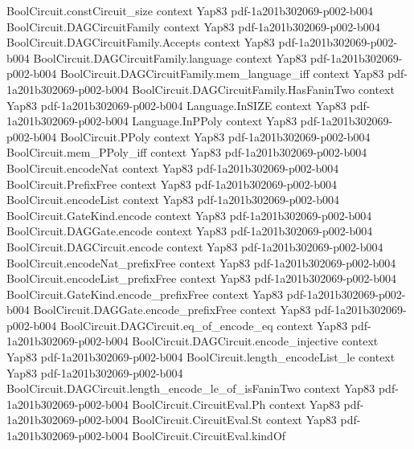 \begin{theorem}
\proofstep
  {BoolCircuit.constCircuit_size}
  {context}
  {Yap83}
  {pdf-1a201b302069-p002-b004}
\proofstep
  {BoolCircuit.DAGCircuitFamily}
  {context}
  {Yap83}
  {pdf-1a201b302069-p002-b004}
\proofstep
  {BoolCircuit.DAGCircuitFamily.Accepts}
  {context}
  {Yap83}
  {pdf-1a201b302069-p002-b004}
\proofstep
  {BoolCircuit.DAGCircuitFamily.language}
  {context}
  {Yap83}
  {pdf-1a201b302069-p002-b004}
\proofstep
  {BoolCircuit.DAGCircuitFamily.mem_language_iff}
  {context}
  {Yap83}
  {pdf-1a201b302069-p002-b004}
\proofstep
  {BoolCircuit.DAGCircuitFamily.HasFaninTwo}
  {context}
  {Yap83}
  {pdf-1a201b302069-p002-b004}
\proofstep
  {Language.InSIZE}
  {context}
  {Yap83}
  {pdf-1a201b302069-p002-b004}
\proofstep
  {Language.InPPoly}
  {context}
  {Yap83}
  {pdf-1a201b302069-p002-b004}
\proofstep
  {BoolCircuit.PPoly}
  {context}
  {Yap83}
  {pdf-1a201b302069-p002-b004}
\proofstep
  {BoolCircuit.mem_PPoly_iff}
  {context}
  {Yap83}
  {pdf-1a201b302069-p002-b004}
\proofstep
  {BoolCircuit.encodeNat}
  {context}
  {Yap83}
  {pdf-1a201b302069-p002-b004}
\proofstep
  {BoolCircuit.PrefixFree}
  {context}
  {Yap83}
  {pdf-1a201b302069-p002-b004}
\proofstep
  {BoolCircuit.encodeList}
  {context}
  {Yap83}
  {pdf-1a201b302069-p002-b004}
\proofstep
  {BoolCircuit.GateKind.encode}
  {context}
  {Yap83}
  {pdf-1a201b302069-p002-b004}
\proofstep
  {BoolCircuit.DAGGate.encode}
  {context}
  {Yap83}
  {pdf-1a201b302069-p002-b004}
\proofstep
  {BoolCircuit.DAGCircuit.encode}
  {context}
  {Yap83}
  {pdf-1a201b302069-p002-b004}
\proofstep
  {BoolCircuit.encodeNat_prefixFree}
  {context}
  {Yap83}
  {pdf-1a201b302069-p002-b004}
\proofstep
  {BoolCircuit.encodeList_prefixFree}
  {context}
  {Yap83}
  {pdf-1a201b302069-p002-b004}
\proofstep
  {BoolCircuit.GateKind.encode_prefixFree}
  {context}
  {Yap83}
  {pdf-1a201b302069-p002-b004}
\proofstep
  {BoolCircuit.DAGGate.encode_prefixFree}
  {context}
  {Yap83}
  {pdf-1a201b302069-p002-b004}
\proofstep
  {BoolCircuit.DAGCircuit.eq_of_encode_eq}
  {context}
  {Yap83}
  {pdf-1a201b302069-p002-b004}
\proofstep
  {BoolCircuit.DAGCircuit.encode_injective}
  {context}
  {Yap83}
  {pdf-1a201b302069-p002-b004}
\proofstep
  {BoolCircuit.length_encodeList_le}
  {context}
  {Yap83}
  {pdf-1a201b302069-p002-b004}
\proofstep
  {BoolCircuit.DAGCircuit.length_encode_le_of_isFaninTwo}
  {context}
  {Yap83}
  {pdf-1a201b302069-p002-b004}
\proofstep
  {BoolCircuit.CircuitEval.Ph}
  {context}
  {Yap83}
  {pdf-1a201b302069-p002-b004}
\proofstep
  {BoolCircuit.CircuitEval.St}
  {context}
  {Yap83}
  {pdf-1a201b302069-p002-b004}
\proofstep
  {BoolCircuit.CircuitEval.kindOf}

\end{theorem}
